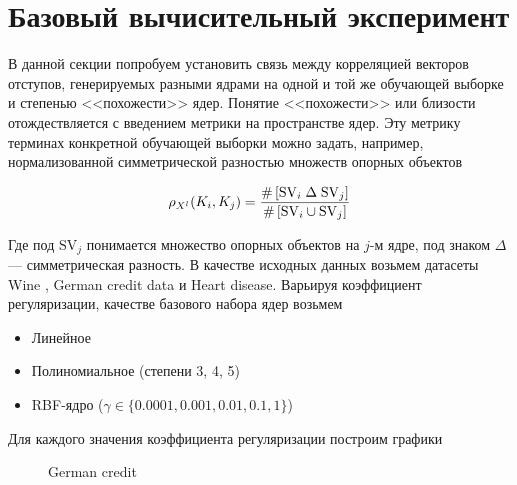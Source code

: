 \documentclass[12pt,twoside]{article}
\begin{document}
\section{Базовый вычисительный эксперимент}

В данной секции попробуем установить связь между корреляцией векторов отступов,
генерируемых
разными ядрами на одной и той же обучающей выборке и степенью <<похожести>>
ядер. Понятие <<похожести>> или близости отождествляется с введением метрики
на пространстве ядер. Эту метрику терминах конкретной обучающей выборки можно
задать, например, нормализованной симметрической разностью множеств опорных объектов

$$
\rho_{X^l}(K_i, K_j) = \frac{\#\left[\mathrm{SV}_i \;\Delta\; \mathrm{SV}_j\right]}
{\#\left[\mathrm{SV}_i \cup \mathrm{SV}_j\right]}
$$

Где под $\mathrm{SV}_j$ понимается множество опорных объектов на $j$-м ядре, под
знаком $\Delta$ --- симметрическая разность. В качестве исходных данных
возьмем датасеты Wine \cite{UCI:Wine}, German credit data\cite{UCI:German} и
Heart disease\cite{UCI:Heart}. Варьируя коэффициент регуляризации,
 качестве базового набора ядер возьмем

\begin{itemize}
    \item Линейное
    \item Полиномиальное (степени 3, 4, 5)
    \item RBF-ядро ($\gamma \in \{0.0001, 0.001, 0.01, 0.1, 1\}$)
\end{itemize}

Для каждого значения коэффициента регуляризации построим графики

\newpage

\begin{figure}[H]
      \caption{German credit}
\end{figure}
\end{document}
